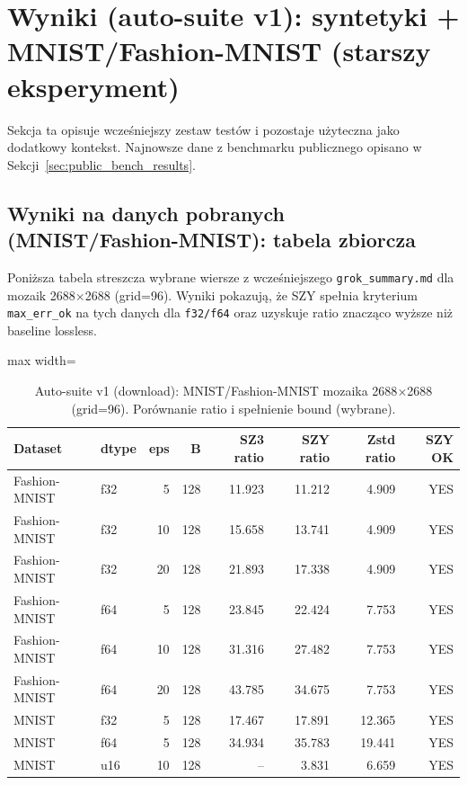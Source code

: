 \documentclass[11pt,a4paper]{article}
\begin{document}
\section{Wyniki (auto-suite v1): syntetyki + MNIST/Fashion-MNIST (starszy eksperyment)}

Sekcja ta opisuje wcześniejszy zestaw testów i pozostaje użyteczna jako dodatkowy kontekst. Najnowsze dane z benchmarku publicznego opisano w Sekcji~\ref{sec:public_bench_results}.

\subsection{Wyniki na danych pobranych (MNIST/Fashion-MNIST): tabela zbiorcza}
Poniższa tabela streszcza wybrane wiersze z wcześniejszego \texttt{grok\_summary.md} dla mozaik 2688$\times$2688 (grid=96).
Wyniki pokazują, że SZY spełnia kryterium \texttt{max\_err\_ok} na tych danych dla \texttt{f32/f64} oraz uzyskuje ratio znacząco wyższe niż baseline lossless.

\begin{table}[H]
\centering
\caption{Auto-suite v1 (download): MNIST/Fashion-MNIST mozaika 2688$\times$2688 (grid=96). Porównanie ratio i spełnienie bound (wybrane).}
\label{tab:mnist_fashion_summary}
\begin{adjustbox}{max width=\textwidth}
\begin{tabular}{@{}llrrrrrr@{}}
\toprule
Dataset & dtype & eps & B & SZ3 ratio & SZY ratio & Zstd ratio & SZY OK \\
\midrule
Fashion-MNIST & f32 & 5  & 128 & 11.923 & 11.212 & 4.909 & YES \\
Fashion-MNIST & f32 & 10 & 128 & 15.658 & 13.741 & 4.909 & YES \\
Fashion-MNIST & f32 & 20 & 128 & 21.893 & 17.338 & 4.909 & YES \\
Fashion-MNIST & f64 & 5  & 128 & 23.845 & 22.424 & 7.753 & YES \\
Fashion-MNIST & f64 & 10 & 128 & 31.316 & 27.482 & 7.753 & YES \\
Fashion-MNIST & f64 & 20 & 128 & 43.785 & 34.675 & 7.753 & YES \\
MNIST         & f32 & 5  & 128 & 17.467 & 17.891 & 12.365 & YES \\
MNIST         & f64 & 5  & 128 & 34.934 & 35.783 & 19.441 & YES \\
MNIST         & u16 & 10 & 128 &   --   &  3.831 &  6.659 & YES \\
\bottomrule
\end{tabular}
\end{adjustbox}
\end{table}
\end{document}
